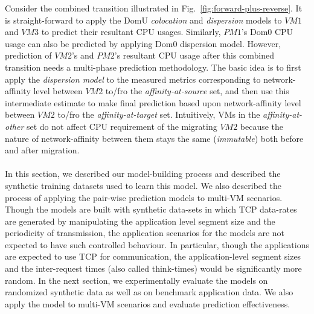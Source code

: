 Consider the combined transition illustrated in Fig.~\ref{fig:forward-plus-reverse}.
It is straight-forward
to apply the DomU \textit{colocation} and \textit{dispersion} models to
$VM1$ and $VM3$ to predict their resultant CPU usages. Similarly, $PM1$'s
Dom0 CPU usage can also be predicted by applying Dom0 dispersion model.
However, prediction of $VM2$'s and $PM2$'s resultant CPU usage after this
combined transition needs a multi-phase prediction methodology.
The basic idea is to first apply the \textit{dispersion model} to the
measured metrics corresponding to network-affinity level between $VM2$
to/fro the \textit{affinity-at-source} set, and then use this
intermediate estimate
to make final prediction based upon network-affinity level
between $VM2$ to/fro the \textit{affinity-at-target} set. Intuitively,
VMs in the \textit{affinity-at-other} set do not affect CPU
requirement of the migrating $VM2$ because the nature of network-affinity
between them stays the same (\textit{immutable}) both before and
after migration.
\\
\\
In this section, we described our model-building process and described
the synthetic training datasets used to learn this model.
We also described the process of applying the pair-wise prediction
models to multi-VM scenarios.
Though the models are built with synthetic data-sets in which
TCP data-rates are generated by manipulating the application level
segment size and the periodicity of transmission, the application
scenarios for the models are not expected to have such controlled
behaviour. In particular, though the applications are
expected to use TCP for communication, the application-level
segment sizes and the inter-request times (also called think-times)
would be significantly more random. In the next section, we experimentally
evaluate the models on randomized synthetic data as well as on
benchmark application data. We also apply the model to multi-VM
scenarios and evaluate prediction effectiveness.

